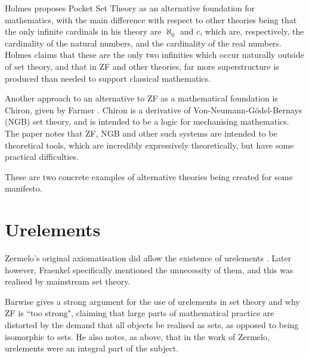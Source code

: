 \documentclass[11pt]{report}
\theoremstyle{definition}
\theoremstyle{theorem}
\theoremstyle{lemma}
\begin{document}
Holmes proposes Pocket Set Theory \cite{pocket} as an alternative foundation for mathematics, with the main difference with respect to other theories being that the only infinite cardinals in his theory are $\aleph_0$ and $c$, which are, respectively, the cardinality of the natural numbers, and the cardinality of the real numbers.
Holmes claims that these are the only two infinities which occur naturally outside of set theory, and that in ZF and other theories, far more superstructure is produced than needed to support classical mathematics.

Another approach to an alternative to ZF as a mathematical foundation is Chiron, given by Farmer \cite{chiron}. Chiron is a derivative of Von-Neumann-G\"odel-Bernays (NGB) set theory, and is intended to be a logic for mechanising mathematics. The paper notes that ZF, NGB and other such systems are intended to be theoretical tools, which are incredibly expressively theoretically, but have some practical difficulties.

These are two concrete examples of alternative theories being created for some manifesto.

\section{Urelements}
Zermelo's original axiomatisation did allow the existence of urelements \cite{zermelo}.
Later however, Fraenkel specifically mentioned the unnecessity of them, and this was realised by mainstream set theory.

Barwise \cite{barwise} gives a strong argument for the use of urelements in set theory and why ZF is ``too strong", claiming that large parts of mathematical practice are distorted by the demand that all objects be realised as sets, as opposed to being isomorphic to sets.
He also notes, as above, that in the work of Zermelo, urelements were an integral part of the subject.
\end{document}
